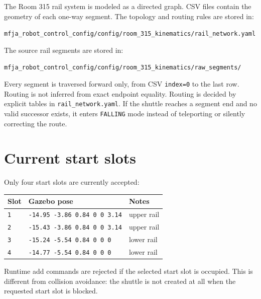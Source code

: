 \documentclass[12pt,a4paper]{report}
\begin{document}
The Room 315 rail system is modeled as a directed graph. CSV files contain the
geometry of each one-way segment. The topology and routing rules are stored in:

\begin{center}
\texttt{mfja\_robot\_control\_config/config/room\_315\_kinematics/rail\_network.yaml}
\end{center}

The source rail segments are stored in:

\begin{center}
\texttt{mfja\_robot\_control\_config/config/room\_315\_kinematics/raw\_segments/}
\end{center}

Every segment is traversed forward only, from CSV \texttt{index=0} to the last
row. Routing is not inferred from exact endpoint equality. Routing is decided
by explicit tables in \texttt{rail\_network.yaml}. If the shuttle reaches a
segment end and no valid successor exists, it enters \texttt{FALLING} mode
instead of teleporting or silently correcting the route.

\section{Current start slots}

Only four start slots are currently accepted:

\begin{longtable}{@{}lll@{}}
\toprule
Slot & Gazebo pose & Notes \\
\midrule
\endhead
\texttt{1} & \texttt{-14.95 -3.86 0.84 0 0 3.14} & upper rail \\
\texttt{2} & \texttt{-15.43 -3.86 0.84 0 0 3.14} & upper rail \\
\texttt{3} & \texttt{-15.24 -5.54 0.84 0 0 0} & lower rail \\
\texttt{4} & \texttt{-14.77 -5.54 0.84 0 0 0} & lower rail \\
\bottomrule
\end{longtable}

Runtime add commands are rejected if the selected start slot is occupied.
This is different from collision avoidance: the shuttle is not created at all
when the requested start slot is blocked.
\end{document}
